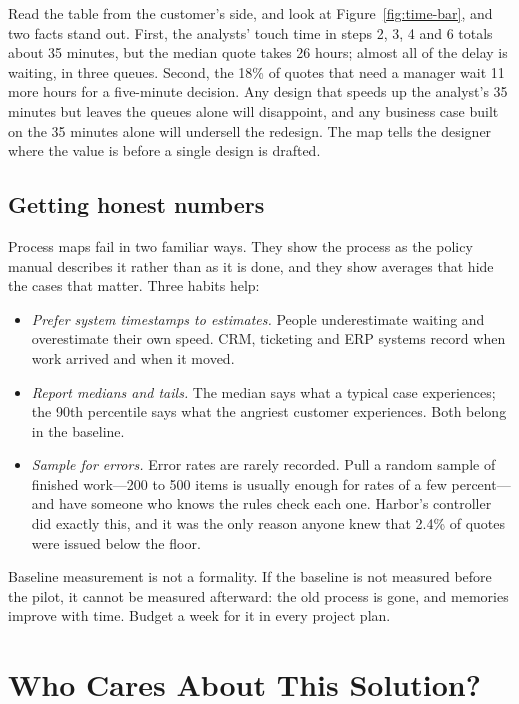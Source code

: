 Read the table from the customer's side, and look at Figure~\ref{fig:time-bar}, and two facts stand out. First, the analysts' touch time in steps 2, 3, 4 and 6 totals about 35 minutes, but the median quote takes 26 hours; almost all of the delay is waiting, in three queues. Second, the 18\% of quotes that need a manager wait 11 more hours for a five-minute decision. Any design that speeds up the analyst's 35 minutes but leaves the queues alone will disappoint, and any business case built on the 35 minutes alone will undersell the redesign. The map tells the designer where the value is before a single design is drafted.

\subsection{Getting honest numbers}

Process maps fail in two familiar ways. They show the process as the policy manual describes it rather than as it is done, and they show averages that hide the cases that matter. Three habits help:
\begin{itemize}[itemsep=1pt]
  \item \emph{Prefer system timestamps to estimates.} People underestimate waiting and overestimate their own speed. CRM, ticketing and ERP systems record when work arrived and when it moved.
  \item \emph{Report medians and tails.} The median says what a typical case experiences; the 90th percentile says what the angriest customer experiences. Both belong in the baseline.
  \item \emph{Sample for errors.} Error rates are rarely recorded. Pull a random sample of finished work---200 to 500 items is usually enough for rates of a few percent---and have someone who knows the rules check each one. Harbor's controller did exactly this, and it was the only reason anyone knew that 2.4\% of quotes were issued below the floor.
\end{itemize}

\begin{designnote}
Baseline measurement is not a formality. If the baseline is not measured before the pilot, it cannot be measured afterward: the old process is gone, and memories improve with time. Budget a week for it in every project plan.
\end{designnote}

\section{Who Cares About This Solution?}
\label{sec:stakeholders}

